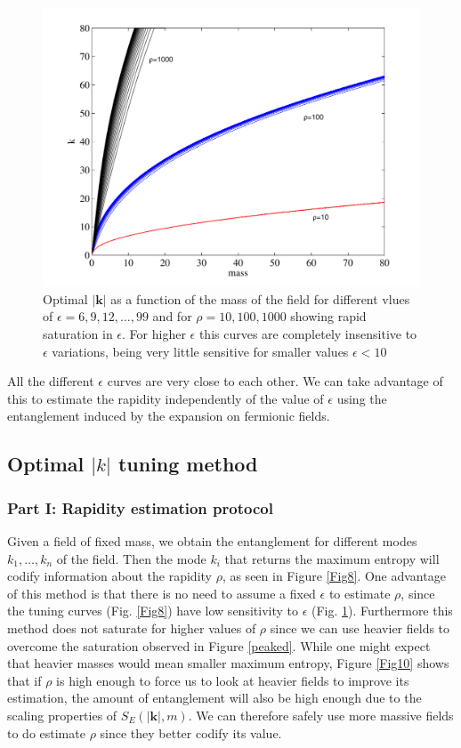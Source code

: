 \begin{figure}[h]
\begin{center}
\includegraphics[width=.89\textwidth]{optimaleps}
\end{center}
\caption{ Optimal $|\bm k|$ as a function of the mass of the field for different vlues of $\epsilon=6,9,12,\dots,99$ and for $\rho=10,100,1000$ showing rapid saturation in $\epsilon$. For higher $\epsilon$ this curves are completely insensitive to $\epsilon$ variations, being very little sensitive for smaller values $\epsilon<10$}
\label{Figsat}
\end{figure}
All the different $\epsilon$ curves are very close to each other. We can take advantage of this to estimate the rapidity independently of the value of $\epsilon$ using the entanglement induced by the expansion on fermionic fields.

\subsection{Optimal $|k|$ tuning method}

\subsubsection{Part I: Rapidity estimation protocol}

Given a field of fixed mass, we obtain the entanglement for different modes $k_1,\dots,k_n$ of the field. Then the mode $k_i$ that returns the maximum entropy will codify information about the rapidity $\rho$, as seen in Figure \ref{Fig8}.  One advantage of this method is that there is no need to assume a fixed $\epsilon$ to estimate $\rho$, since the tuning curves (Fig. \ref{Fig8}) have low sensitivity to $\epsilon$ (Fig. \ref{Figsat}). Furthermore this method does not saturate for  higher values of $\rho$ since we can use heavier fields to overcome the saturation observed in Figure \ref{peaked}. While one might expect  that heavier masses would mean smaller  maximum entropy, Figure \ref{Fig10} shows  that if $\rho$ is  high enough
to force us to look at heavier fields to improve its estimation, the  amount of entanglement will also be high enough due to the scaling properties of $S_E(|\bm k|,m)$. We can therefore safely use more massive fields to do estimate $\rho$ since they better codify its value.  


